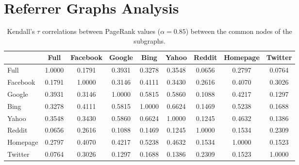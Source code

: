 \documentclass{sig-alternate-2013}
\begin{document}
\section{Referrer Graphs Analysis} \label{sec:analysis} 
% 
\begin{table}[!ht]\centering
  \begin{tabular}{@{}lcccccccc} \toprule
  & \textbf{Full} & \textbf{Facebook} & \textbf{Google} & \textbf{Bing} & \textbf{Yahoo}  & \textbf{Reddit} & \textbf{Homepage} & \textbf{Twitter}  \\
  \midrule
  Full& \cellcolor[gray]{0.40}1.0000  & \cellcolor[gray]{0.89}0.1791  & \cellcolor[gray]{0.76}0.3931  & \cellcolor[gray]{0.80}0.3278  & \cellcolor[gray]{0.79}0.3548  & \cellcolor[gray]{0.96}0.0656  & \cellcolor[gray]{0.83}0.2797  & \cellcolor[gray]{0.95}0.0764  \\
  Facebook& \cellcolor[gray]{0.89}0.1791  & \cellcolor[gray]{0.40}1.0000  & \cellcolor[gray]{0.81}0.3146  & \cellcolor[gray]{0.75}0.4111  & \cellcolor[gray]{0.79}0.3430  & \cellcolor[gray]{0.84}0.2616  & \cellcolor[gray]{0.76}0.4070  & \cellcolor[gray]{0.82}0.3026  \\
  Google& \cellcolor[gray]{0.76}0.3931  & \cellcolor[gray]{0.81}0.3146  & \cellcolor[gray]{0.40}1.0000  & \cellcolor[gray]{0.65}0.5815  & \cellcolor[gray]{0.65}0.5860  & \cellcolor[gray]{0.93}0.1088  & \cellcolor[gray]{0.75}0.4217  & \cellcolor[gray]{0.92}0.1297  \\
  Bing& \cellcolor[gray]{0.80}0.3278  & \cellcolor[gray]{0.75}0.4111  & \cellcolor[gray]{0.65}0.5815  & \cellcolor[gray]{0.40}1.0000  & \cellcolor[gray]{0.60}0.6624  & \cellcolor[gray]{0.91}0.1469  & \cellcolor[gray]{0.69}0.5238  & \cellcolor[gray]{0.90}0.1688  \\
  Yahoo& \cellcolor[gray]{0.79}0.3548 & \cellcolor[gray]{0.79}0.3430  & \cellcolor[gray]{0.65}0.5860  & \cellcolor[gray]{0.60}0.6624  & \cellcolor[gray]{0.40}1.0000  & \cellcolor[gray]{0.93}0.1245  & \cellcolor[gray]{0.72}0.4632  & \cellcolor[gray]{0.92}0.1386  \\
  Reddit& \cellcolor[gray]{0.96}0.0656  & \cellcolor[gray]{0.84}0.2616  & \cellcolor[gray]{0.93}0.1088  & \cellcolor[gray]{0.91}0.1469  & \cellcolor[gray]{0.93}0.1245  & \cellcolor[gray]{0.40}1.0000  & \cellcolor[gray]{0.91}0.1534  & \cellcolor[gray]{0.86}0.2309  \\
  Homepage& \cellcolor[gray]{0.83}0.2797  & \cellcolor[gray]{0.76}0.4070  & \cellcolor[gray]{0.75}0.4217  & \cellcolor[gray]{0.69}0.5238  & \cellcolor[gray]{0.72}0.4632  & \cellcolor[gray]{0.91}0.1534  & \cellcolor[gray]{0.40}1.0000  & \cellcolor[gray]{0.91}0.1523  \\
  Twitter& \cellcolor[gray]{0.95}0.0764 & \cellcolor[gray]{0.82}0.3026  & \cellcolor[gray]{0.92}0.1297  & \cellcolor[gray]{0.90}0.1688  & \cellcolor[gray]{0.92}0.1386  & \cellcolor[gray]{0.86}0.2309  & \cellcolor[gray]{0.91}0.1523  & \cellcolor[gray]{0.40}1.0000  \\
  \bottomrule
  \end{tabular}
  \caption{Kendall's $\tau$ correlations between PageRank values ($\alpha=0.85$) between the common nodes of the subgraphs.}
  \label{tab:kendallsubgraphs}
\end{table}
\end{document}
